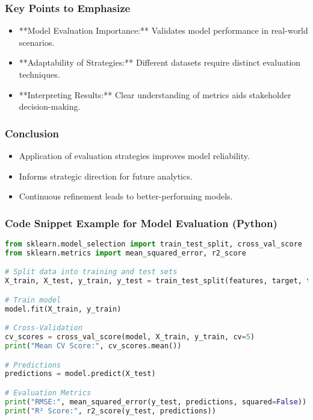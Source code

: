 \documentclass[aspectratio=169]{beamer}
\begin{document}
\begin{frame}
  \frametitle{Key Points to Emphasize}
  \begin{itemize}
    \item **Model Evaluation Importance:** Validates model performance in real-world scenarios.
    \item **Adaptability of Strategies:** Different datasets require distinct evaluation techniques.
    \item **Interpreting Results:** Clear understanding of metrics aids stakeholder decision-making.
  \end{itemize}
\end{frame}

\begin{frame}[fragile]
  \frametitle{Conclusion}
  \begin{itemize}
    \item Application of evaluation strategies improves model reliability.
    \item Informs strategic direction for future analytics.
    \item Continuous refinement leads to better-performing models.
  \end{itemize}
\end{frame}

\begin{frame}[fragile]
  \frametitle{Code Snippet Example for Model Evaluation (Python)}
  \begin{lstlisting}[language=Python]
from sklearn.model_selection import train_test_split, cross_val_score
from sklearn.metrics import mean_squared_error, r2_score

# Split data into training and test sets
X_train, X_test, y_train, y_test = train_test_split(features, target, test_size=0.2)

# Train model
model.fit(X_train, y_train)

# Cross-Validation
cv_scores = cross_val_score(model, X_train, y_train, cv=5)
print("Mean CV Score:", cv_scores.mean())

# Predictions
predictions = model.predict(X_test)

# Evaluation Metrics
print("RMSE:", mean_squared_error(y_test, predictions, squared=False))
print("R² Score:", r2_score(y_test, predictions))
  \end{lstlisting}
\end{frame}
\end{document}
